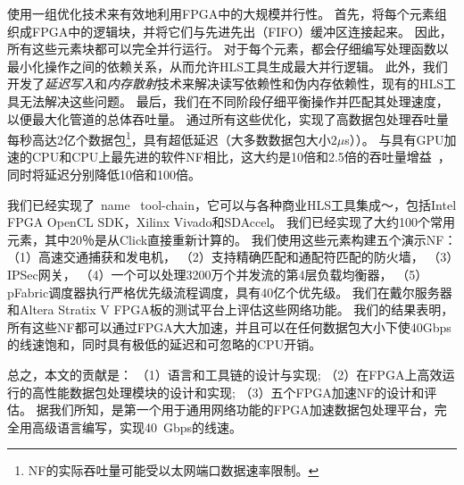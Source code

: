 \name{}使用一组优化技术来有效地利用FPGA中的大规模并行性。
首先，\name{}将每个元素组织成FPGA中的逻辑块，并将它们与先进先出（FIFO）缓冲区连接起来。
因此，所有这些元素块都可以完全并行运行。
对于每个元素，都会仔细编写处理函数以最小化操作之间的依赖关系，从而允许HLS工具生成最大并行逻辑。
此外，我们开发了\textit {延迟写入}和\textit {内存散射}技术来解决读写依赖性和伪内存依赖性，现有的HLS工具无法解决这些问题。
最后，我们在不同阶段仔细平衡操作并匹配其处理速度，以便最大化管道的总体吞吐量。
通过所有这些优化，\name{}实现了高数据包处理吞吐量
每秒高达2亿个数据包\footnote {\name{} NF的实际吞吐量可能受以太网端口数据速率限制。}，具有超低延迟（大多数数据包大小$ 2 \mu$s））。
与具有GPU加速的CPU和CPU上最先进的软件NF相比，这大约是10倍和2.5倍的吞吐量增益~\cite {packetshader}，
同时将延迟分别降低10倍和100倍。

我们已经实现了\ name \ tool-chain，它可以与各种商业HLS工具集成〜\cite {vivado,aoc}，包括Intel FPGA OpenCL SDK，Xilinx Vivado和SDAccel。
我们已经实现了大约100个常用元素，其中20％是从Click直接重新计算的。
我们使用这些元素构建五个演示NF：
（1）高速交通捕获和发电机，
（2）支持精确匹配和通配符匹配的防火墙，
（3）IPSec网关，
（4）一个可以处理3200万个并发流的第4层负载均衡器，
（5）pFabric调度器\cite {pfabric}执行严格优先级流程调度，具有40亿个优先级。
我们在戴尔服务器和Altera Stratix V FPGA板的测试平台上评估这些网络功能\cite {putnam2014reconfigurable}。
我们的结果表明，所有这些NF都可以通过FPGA大大加速，并且可以在任何数据包大小下使40Gbps的线速饱和，同时具有极低的延迟和可忽略的CPU开销。

总之，本文的贡献是：
（1）\name 语言和工具链的设计与实现;
（2）在FPGA上高效运行的高性能数据包处理模块的设计和实现;
（3）五个FPGA加速NF的设计和评估。
据我们所知，\name 是第一个用于通用网络功能的FPGA加速数据包处理平台，完全用高级语言编写，实现40~Gbps的线速。

